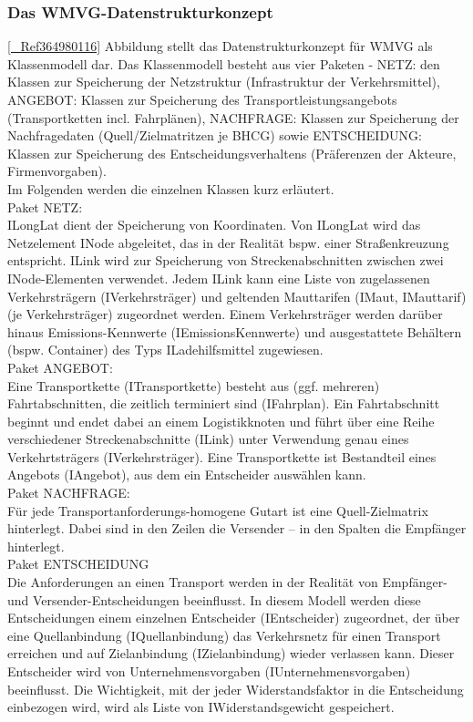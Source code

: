 \subsubsection{Das WMVG-Datenstrukturkonzept}
\label{_Toc366766120}
\label{_Toc366775314}
\label{_Ref364980166}
\label{_Toc365801609}
\label{_Ref361848180}
\label{_Toc363572049}
\label{_Toc363601746}
\autoref{_Ref364980116} Abbildung  stellt das Datenstrukturkonzept für WMVG als Klassenmodell dar. Das Klassenmodell besteht aus vier Paketen - NETZ: den Klassen zur Speicherung der Netzstruktur (Infrastruktur der Verkehrsmittel), ANGEBOT: Klassen zur Speicherung des Transportleistungsangebots (Transportketten incl. Fahrplänen), NACHFRAGE: Klassen zur Speicherung der Nachfragedaten (Quell/Zielmatritzen je BHCG) sowie ENTSCHEIDUNG: Klassen zur Speicherung des Entscheidungsverhaltens (Präferenzen der Akteure, Firmenvorgaben).~\\
Im Folgenden werden die einzelnen Klassen kurz erläutert.~\\
Paket NETZ:~\\
ILongLat dient der Speicherung von Koordinaten. Von ILongLat wird das Netzelement INode abgeleitet, das in der Realität bspw. einer Straßenkreuzung entspricht. ILink wird zur Speicherung von Streckenabschnitten zwischen zwei INode-Elementen verwendet. Jedem ILink kann eine Liste von zugelassenen Verkehrsträgern (IVerkehrsträger) und geltenden Mauttarifen (IMaut, IMauttarif) (je Verkehrsträger) zugeordnet werden. Einem Verkehrsträger werden darüber hinaus Emissions-Kennwerte (IEmissionsKennwerte) und ausgestattete Behältern (bspw. Container) des Typs ILadehilfsmittel zugewiesen.~\\
Paket ANGEBOT:~\\
Eine Transportkette (ITransportkette) besteht aus (ggf. mehreren) Fahrtabschnitten, die zeitlich terminiert sind (IFahrplan). Ein Fahrtabschnitt beginnt und endet dabei an einem Logistikknoten und führt über eine Reihe verschiedener Streckenabschnitte (ILink) unter Verwendung genau eines Verkehrtsträgers (IVerkehrsträger). Eine Transportkette ist Bestandteil eines Angebots (IAngebot), aus dem ein Entscheider auswählen kann.~\\
Paket NACHFRAGE: ~\\
Für jede Transportanforderungs-homogene Gutart ist eine Quell-Zielmatrix hinterlegt. Dabei sind in den Zeilen die Versender – in den Spalten die Empfänger hinterlegt.~\\
Paket ENTSCHEIDUNG~\\
Die Anforderungen an einen Transport werden in der Realität von Empfänger- und Versender-Entscheidungen beeinflusst. In diesem Modell werden diese Entscheidungen einem einzelnen Entscheider (IEntscheider) zugeordnet, der über eine Quellanbindung (IQuellanbindung) das Verkehrsnetz für einen Transport erreichen und auf Zielanbindung (IZielanbindung) wieder verlassen kann. Dieser Entscheider wird von Unternehmensvorgaben (IUnternehmensvorgaben) beeinflusst. Die Wichtigkeit, mit der jeder Widerstandsfaktor in die Entscheidung einbezogen wird, wird als Liste von IWiderstandsgewicht gespeichert.~\\

